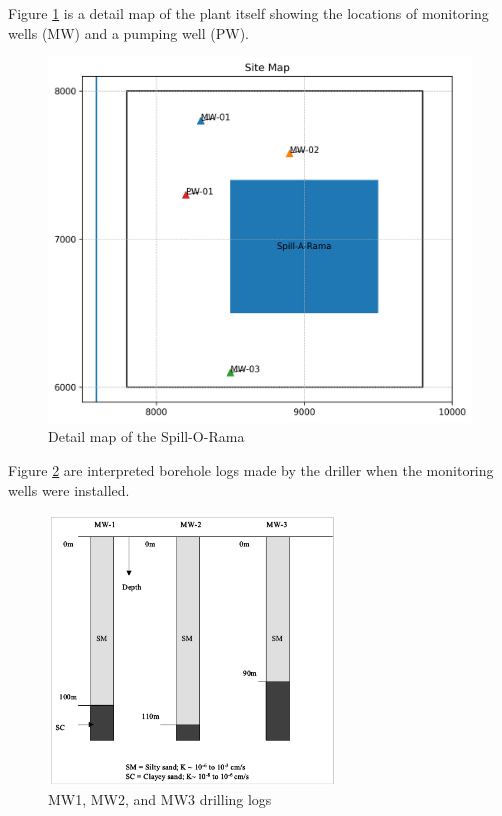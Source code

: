 \documentclass[12pt]{article}
\begin{document}
\begin{enumerate}
Figure \ref{fig:site_map_homework2} is a detail map of the plant itself showing the locations of monitoring wells (MW) and a pumping well (PW).

\begin{figure}[h!] %
   \centering
   \includegraphics[width=6in]{site_map_homework2.png} 
   \caption{Detail map of the Spill-O-Rama}
   \label{fig:site_map_homework2}
\end{figure}

\clearpage
Figure \ref{fig:drillinglogs} are interpreted borehole logs made by the driller when the monitoring wells were installed.

\begin{figure}[h!] %
   \centering
   \includegraphics[width=3in]{drillinglogs.png} 
   \caption{MW1, MW2, and MW3 drilling logs}
   \label{fig:drillinglogs}
\end{figure}


\end{enumerate}
\end{document}
